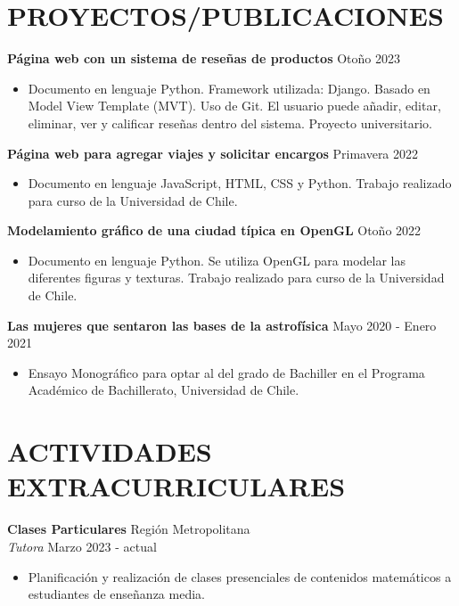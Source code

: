 \documentclass[a4paper, 10pt]{extarticle}
\begin{document}
\section*{PROYECTOS/PUBLICACIONES}
\noindent
\textbf{Página web con un sistema de reseñas de productos} \textcolor{blue}{\href{https://github.com/Estefania-M/Pagina-Web-Resenas}{\faLink}} \hfill Otoño 2023
\begin{itemize}
    \item Documento en lenguaje Python. Framework utilizada: Django. Basado en Model View Template (MVT). Uso de Git. El usuario puede añadir, editar, eliminar, ver y calificar reseñas dentro del sistema. Proyecto universitario.
\end{itemize}
\noindent
\textbf{Página web para agregar viajes y solicitar encargos} \textcolor{blue}{\href{https://github.com/Estefania-M/Pagina-Web-Encargos-Viajes}{\faLink}} \hfill Primavera 2022
\begin{itemize}
    \item Documento en lenguaje JavaScript, HTML, CSS y Python. Trabajo realizado para curso de la Universidad de Chile.
\end{itemize}

\noindent
\textbf{Modelamiento gráfico de una ciudad típica en OpenGL} \textcolor{blue}{\href{https://github.com/Estefania-M/Modelamiento-Ciudad}{\faLink}} \hfill Otoño 2022
\begin{itemize}
    \item Documento en lenguaje Python. Se utiliza OpenGL para modelar las diferentes figuras y texturas. Trabajo realizado para curso de la Universidad de Chile.
\end{itemize}

\noindent
\textbf{Las mujeres que sentaron las bases
de la astrofísica} \textcolor{blue}{\href{https://github.com/Estefania-M/Monografia}{\faLink}} \hfill Mayo 2020 - Enero 2021
\begin{itemize}
    \item Ensayo Monográfico para optar al del grado de Bachiller en el Programa Académico de Bachillerato, Universidad de Chile.
\end{itemize}

\section*{ACTIVIDADES EXTRACURRICULARES}
\noindent
\textbf{Clases Particulares} \hfill Región Metropolitana\\
\textit{Tutora} \hfill Marzo 2023 - actual 
\begin{itemize}
    \item Planificación y realización de clases presenciales de contenidos matemáticos a estudiantes de enseñanza media.
\end{itemize}
\end{document}

